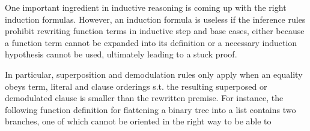 
One important ingredient in inductive reasoning is coming up with the right induction formulas. However, an induction formula is useless if the inference rules prohibit rewriting function terms in inductive step and base cases, either because a function term cannot be expanded into its definition or a necessary induction hypothesis cannot be used, ultimately leading to a stuck proof.

In particular, superposition and demodulation rules only apply when an equality obeys term, literal and clause orderings s.t. the resulting superposed or demodulated clause is smaller than the rewritten premise. For instance, the following function definition for flattening a binary tree into a list contains two branches, one of which cannot be oriented in the right way to be able to 

